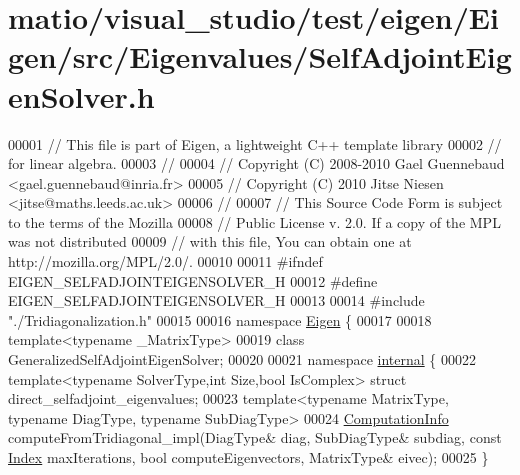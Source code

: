 \hypertarget{matio_2visual__studio_2test_2eigen_2_eigen_2src_2_eigenvalues_2_self_adjoint_eigen_solver_8h_source}{}\section{matio/visual\+\_\+studio/test/eigen/\+Eigen/src/\+Eigenvalues/\+Self\+Adjoint\+Eigen\+Solver.h}
\label{matio_2visual__studio_2test_2eigen_2_eigen_2src_2_eigenvalues_2_self_adjoint_eigen_solver_8h_source}

\begin{DoxyCode}
00001 \textcolor{comment}{// This file is part of Eigen, a lightweight C++ template library}
00002 \textcolor{comment}{// for linear algebra.}
00003 \textcolor{comment}{//}
00004 \textcolor{comment}{// Copyright (C) 2008-2010 Gael Guennebaud <gael.guennebaud@inria.fr>}
00005 \textcolor{comment}{// Copyright (C) 2010 Jitse Niesen <jitse@maths.leeds.ac.uk>}
00006 \textcolor{comment}{//}
00007 \textcolor{comment}{// This Source Code Form is subject to the terms of the Mozilla}
00008 \textcolor{comment}{// Public License v. 2.0. If a copy of the MPL was not distributed}
00009 \textcolor{comment}{// with this file, You can obtain one at http://mozilla.org/MPL/2.0/.}
00010 
00011 \textcolor{preprocessor}{#ifndef EIGEN\_SELFADJOINTEIGENSOLVER\_H}
00012 \textcolor{preprocessor}{#define EIGEN\_SELFADJOINTEIGENSOLVER\_H}
00013 
00014 \textcolor{preprocessor}{#include "./Tridiagonalization.h"}
00015 
00016 \textcolor{keyword}{namespace }\hyperlink{namespace_eigen}{Eigen} \{ 
00017 
00018 \textcolor{keyword}{template}<\textcolor{keyword}{typename} \_MatrixType>
00019 \textcolor{keyword}{class }GeneralizedSelfAdjointEigenSolver;
00020 
00021 \textcolor{keyword}{namespace }\hyperlink{namespaceinternal}{internal} \{
00022 \textcolor{keyword}{template}<\textcolor{keyword}{typename} SolverType,\textcolor{keywordtype}{int} Size,\textcolor{keywordtype}{bool} IsComplex> \textcolor{keyword}{struct }direct\_selfadjoint\_eigenvalues;
00023 \textcolor{keyword}{template}<\textcolor{keyword}{typename} MatrixType, \textcolor{keyword}{typename} DiagType, \textcolor{keyword}{typename} SubDiagType>
00024 \hyperlink{group__enums_ga85fad7b87587764e5cf6b513a9e0ee5e}{ComputationInfo} computeFromTridiagonal\_impl(DiagType& diag, SubDiagType& subdiag, \textcolor{keyword}{const} 
      \hyperlink{namespace_eigen_a62e77e0933482dafde8fe197d9a2cfde}{Index} maxIterations, \textcolor{keywordtype}{bool} computeEigenvectors, MatrixType& eivec);
00025 \}

\end{DoxyCode}
